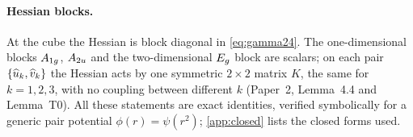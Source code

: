 \paragraph{Hessian blocks.} At the cube the Hessian is block diagonal in \eqref{eq:gamma24}. The one-dimensional blocks
$A_{1g}$, $A_{2u}$ and the two-dimensional $E_{g}$ block are scalars; on each pair $\{\widehat{u}_k,\widehat{v}_k\}$ the Hessian acts by one
symmetric $2\times2$ matrix $K$, the same for $k=1,2,3$, with no coupling between different $k$ (Paper~2, Lemma~4.4 and
Lemma~T0). All these statements are exact identities, verified symbolically for a generic pair potential
$\phi(r)=\psi(r^2)$; \cref{app:closed} lists the closed forms used.
